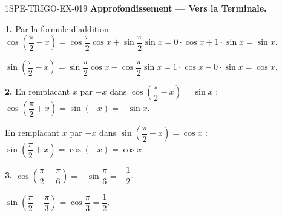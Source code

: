 \begin{corrige}{1SPE-TRIGO-EX-019}
\textbf{Approfondissement — Vers la Terminale.}

\textbf{1.} Par la formule d'addition :
$\cos\!\left(\dfrac{\pi}{2} - x\right) = \cos\dfrac{\pi}{2}\cos x + \sin\dfrac{\pi}{2}\sin x = 0 \cdot \cos x + 1 \cdot \sin x = \sin x$.

$\sin\!\left(\dfrac{\pi}{2} - x\right) = \sin\dfrac{\pi}{2}\cos x - \cos\dfrac{\pi}{2}\sin x = 1 \cdot \cos x - 0 \cdot \sin x = \cos x$.

\textbf{2.} En remplacant $x$ par $-x$ dans $\cos\!\left(\dfrac{\pi}{2} - x\right) = \sin x$ :
$\cos\!\left(\dfrac{\pi}{2} + x\right) = \sin(-x) = -\sin x$.

En remplacant $x$ par $-x$ dans $\sin\!\left(\dfrac{\pi}{2} - x\right) = \cos x$ :
$\sin\!\left(\dfrac{\pi}{2} + x\right) = \cos(-x) = \cos x$.

\textbf{3.} $\cos\!\left(\dfrac{\pi}{2} + \dfrac{\pi}{6}\right) = -\sin\dfrac{\pi}{6} = -\dfrac{1}{2}$.

$\sin\!\left(\dfrac{\pi}{2} - \dfrac{\pi}{3}\right) = \cos\dfrac{\pi}{3} = \dfrac{1}{2}$.

\end{corrige}
